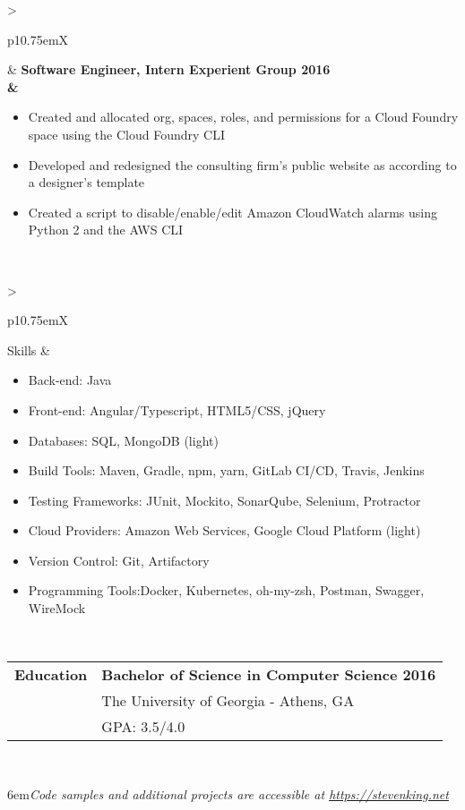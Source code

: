 \documentclass[final]{letter}
\begin{document}
\begin{center}
\begin{tabularx}{\linewidth}{>{\raggedright\bf\Large{}}p{10.75em}X}
		& \large\bf{Software Engineer, Intern \hfill {Experient Group} \hfill 2016} \\
			& \begin{itemize}[noitemsep,topsep=0pt]\setlength\itemsep{2px}
				\item Created and allocated org, spaces, roles, and permissions for a Cloud Foundry space using the Cloud Foundry CLI
				\item Developed and redesigned the consulting firm's public website as according to a designer's template
				\item Created a script to disable/enable/edit Amazon CloudWatch alarms using Python 2 and the AWS CLI
			\end{itemize}
	\end{tabularx} \\

	\begin{tabularx}{\linewidth}{>{\raggedright\bf\Large{}}p{10.75em}X} Skills 
		& \begin{itemize}[noitemsep,topsep=0pt]\setlength\itemsep{0px}
			\item[] Back-end: \tab Java
			\item[] Front-end: \tab Angular/Typescript, HTML5/CSS, jQuery
			\item[] Databases: \tab SQL, MongoDB (light)
			\item[] Build Tools: \tab Maven, Gradle, npm, yarn, GitLab CI/CD, Travis, Jenkins
			\item[] Testing Frameworks: \tab JUnit, Mockito, SonarQube, Selenium, Protractor
			\item[] Cloud Providers: \tab Amazon Web Services, Google Cloud Platform (light)
			\item[] Version Control: \tab Git, Artifactory
			\item[] Programming Tools:\tab Docker, Kubernetes, oh-my-zsh, Postman, Swagger, WireMock
		\end{itemize}
	\end{tabularx} \\

	\begin{tabularx}{\linewidth}{>{\raggedright\bf\Large{}}p{10.75em}X} Education 
		& \large\bf{Bachelor of Science in Computer Science  \hfill 2016} \\
		& \large{The University of Georgia - Athens, GA} \\
		& \hspace{1.75em}GPA: 3.5/4.0 \\
	\end{tabularx} \\

	\addvspace{.65cm}

	\parindent6em\textit{Code samples and additional projects are accessible at \url{https://stevenking.net}}
\end{center}
\end{document}
